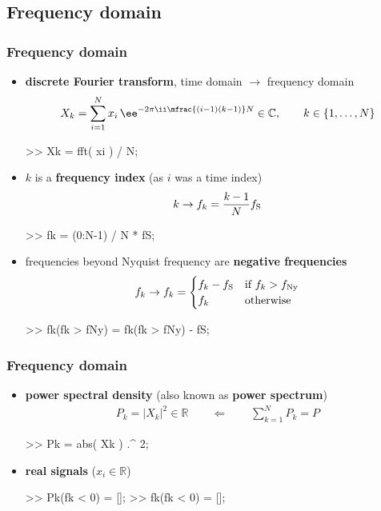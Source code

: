 
\subsection{Frequency domain}

\begin{frame}[fragile]
	\frametitle{Frequency domain}
	\begin{itemize}
		\item \textbf{discrete Fourier transform}, time domain $\rightarrow$ frequency domain
			\begin{align*}
				X_k=\sum_{i=1}^Nx_i\,\ee^{-2\pi\ii\mfrac{(i-1)(k-1)}N}\in\mathbb C,\qquad k\in\{1,\ldots,N\}
			\end{align*}
			\begin{code}
>> Xk = fft( xi ) / N; \color{medium}%
			\end{code}
		\item $k$ is a \textbf{frequency index} (as $i$ was a time index)
			\begin{align*}
				k\rightarrow f_k=\frac{k-1}Nf_{\textrm S}
			\end{align*}
			\begin{code}
>> fk = (0:N-1) / N * fS; \color{medium}%
			\end{code}
		\item frequencies beyond Nyquist frequency are \textbf{negative frequencies}
			\begin{align*}
				f_k\rightarrow f_k=\begin{cases}f_k-f_{\textrm S}&\textrm{if $f_k>f_{\textrm{Ny}}$}\\f_k&\textrm{otherwise}\end{cases}
			\end{align*}
			\begin{code}
>> fk(fk > fNy) = fk(fk > fNy) - fS; \color{medium}%
			\end{code}
	\end{itemize}
\end{frame}

\begin{frame}[fragile]
	\frametitle{Frequency domain}
	\begin{itemize}
		\item \textbf{power spectral density} (also known as \textbf{power spectrum})
			\begin{align*}
				P_k=\lvert X_k\rvert^2\in\mathbb R\qquad\Leftarrow\qquad\sum_{k=1}^NP_k=P
			\end{align*}
			\begin{code}
>> Pk = abs( Xk ) .^ 2; \color{medium}%
			\end{code}
		\item \textbf{real signals} ($x_i\in\mathbb R$)
			\begin{code}
>> Pk(fk < 0) = []; \color{medium}%
>> fk(fk < 0) = [];
			\end{code}
	\end{itemize}
\end{frame}

